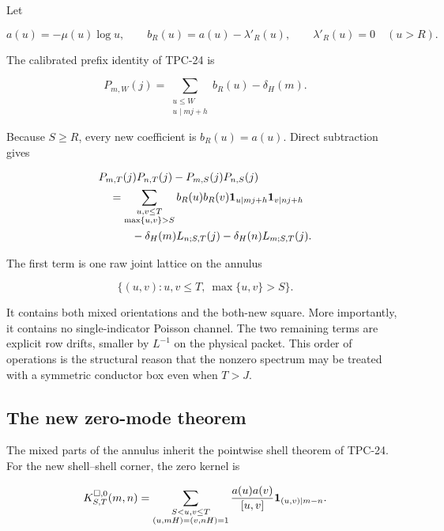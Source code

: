 Let

\[
 a(u)=-\mu(u)\log u,
 \qquad b_R(u)=a(u)-\lambda'_R(u),
 \qquad \lambda'_R(u)=0\quad(u>R).
\]

The calibrated prefix identity of TPC-24 is

\begin{equation}
 P_{m,W}(j)=
 \sum_{\substack{u\le W\\u\mid mj+h}}b_R(u)-\delta_H(m).
 \label{eq:tpc26-intro-prefix}
\end{equation}

Because \(S\ge R\), every new coefficient is \(b_R(u)=a(u)\).  Direct
subtraction gives

\begin{align}
 &P_{m,T}(j)P_{n,T}(j)-P_{m,S}(j)P_{n,S}(j)
 \notag\\
 &\quad=
 \sum_{\substack{u,v\le T\\\max\{u,v\}>S}}
 b_R(u)b_R(v)
 \mathbf 1_{u\mid mj+h}\mathbf 1_{v\mid nj+h}
 \notag\\
 &\qquad\quad
 -\delta_H(m)L_{n;S,T}(j)
 -\delta_H(n)L_{m;S,T}(j).
 \label{eq:tpc26-intro-annular-identity}
\end{align}

The first term is one raw joint lattice on the annulus

\[
 \{(u,v):u,v\le T,\ \max\{u,v\}>S\}.
\]

It contains both mixed orientations and the both-new square.  More
importantly, it contains no single-indicator Poisson channel.  The two
remaining terms are explicit row drifts, smaller by \(L^{-1}\) on the
physical packet.  This order of operations is the structural reason
that the nonzero spectrum may be treated with a symmetric conductor
box even when \(T>J\).

\subsection{The new zero-mode theorem}

The mixed parts of the annulus inherit the pointwise shell theorem of
TPC-24.  For the new shell--shell corner, the zero kernel is

\begin{equation}
 K^{\square,0}_{S,T}(m,n)
 =
 \sum_{\substack{S<u,v\le T\\
                  (u,mH)=(v,nH)=1}}
 \frac{a(u)a(v)}{[u,v]}
 \mathbf 1_{(u,v)\mid m-n}.
 \label{eq:tpc26-intro-square-zero}
\end{equation}

